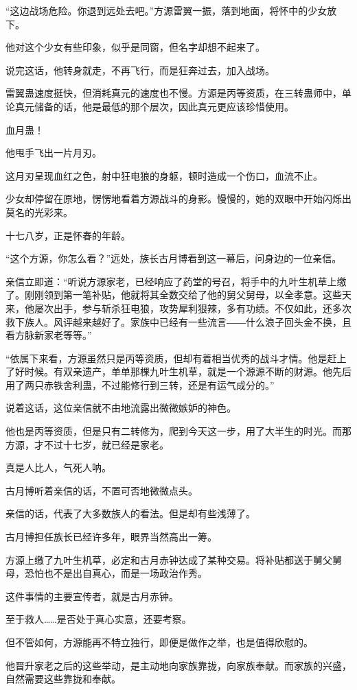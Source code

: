\begin{this_body}
“这边战场危险。你退到远处去吧。”方源雷翼一振，落到地面，将怀中的少女放下。

他对这个少女有些印象，似乎是同窗，但名字却想不起来了。

说完这话，他转身就走，不再飞行，而是狂奔过去，加入战场。

雷翼蛊速度挺快，但消耗真元的速度也不慢。方源是丙等资质，在三转蛊师中，单论真元储备的话，他是最低的那个层次，因此真元更应该珍惜使用。

血月蛊！

他甩手飞出一片月刃。

这月刃呈现血红之色，射中狂电狼的身躯，顿时造成一个伤口，血流不止。

少女却停留在原地，愣愣地看着方源战斗的身影。慢慢的，她的双眼中开始闪烁出莫名的光彩来。

十七八岁，正是怀春的年龄。

“这个方源，你怎么看？”远处，族长古月博看到这一幕后，问身边的一位亲信。

亲信立即道：“听说方源家老，已经响应了药堂的号召，将手中的九叶生机草上缴了。刚刚领到第一笔补贴，他就将其全数交给了他的舅父舅母，以全孝意。这些天来，他屡次出手，参与斩杀狂电狼，攻势犀利狠辣，多有功绩。不仅如此，还多次救下族人。风评越来越好了。家族中已经有一些流言――什么浪子回头金不换，且看方脉新家老等等。”

“依属下来看，方源虽然只是丙等资质，但却有着相当优秀的战斗才情。他是赶上了好时候。有双亲遗产，单单那棵九叶生机草，就是一个源源不断的财源。他先后用了两只赤铁舍利蛊，不过能修行到三转，还是有运气成分的。”

说着这话，这位亲信就不由地流露出微微嫉妒的神色。

他也是丙等资质，但是只有二转修为，爬到今天这一步，用了大半生的时光。而那方源，才不过十七岁，就已经是家老。

真是人比人，气死人呐。

古月博听着亲信的话，不置可否地微微点头。

亲信的话，代表了大多数族人的看法。但是却有些浅薄了。

古月博担任族长已经许多年，眼界当然高出一筹。

方源上缴了九叶生机草，必定和古月赤钟达成了某种交易。将补贴都送于舅父舅母，恐怕也不是出自真心，而是一场政治作秀。

这件事情的主要宣传者，就是古月赤钟。

至于救人……是否处于真心实意，还要考察。

但不管如何，方源能再不特立独行，即便是做作之举，也是值得欣慰的。

他晋升家老之后的这些举动，是主动地向家族靠拢，向家族奉献。而家族的兴盛，自然需要这些靠拢和奉献。


\end{this_body}
